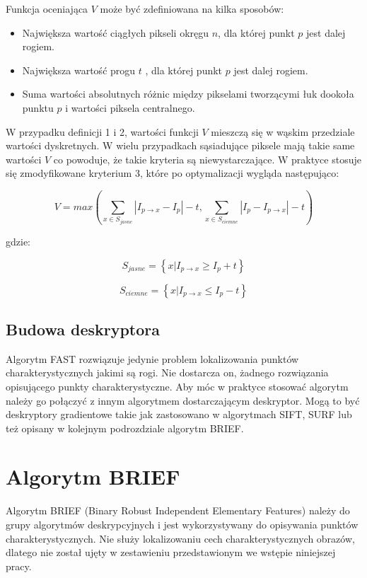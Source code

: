 Funkcja oceniająca $V$ może być zdefiniowana na kilka sposobów:
\begin{itemize}
\item Największa wartość ciągłych pikseli okręgu $n$, dla której punkt $p$ jest dalej rogiem.
\item Największa wartość progu $t$ , dla której punkt $p$ jest dalej rogiem.
\item Suma wartości absolutnych różnic między pikselami tworzącymi łuk dookoła punktu $p$ i wartości piksela centralnego.
\end{itemize}

W przypadku definicji 1 i 2, wartości funkcji $V$ mieszczą się w wąskim przedziale wartości dyskretnych. W wielu przypadkach sąsiadujące piksele mają takie same wartości $V$ co powoduje, że takie kryteria są niewystarczające. W praktyce stosuje się zmodyfikowane kryterium 3, które po optymalizacji wygląda następująco:


\begin{equation}
V = max \left( \sum_{x\in S_{jasne}} |I_{p \rightarrow x}-I_p| - t , \sum_{x\in S_{ciemne}} |I_p-I_{p \rightarrow x}| - t  \right)
\end{equation}

gdzie:

\begin{equation}
S_{jasne} = \left\lbrace x|I_{p\rightarrow x} \geq I_{p} + t \right\rbrace
\end{equation}

\begin{equation}
S_{ciemne} = \left\lbrace x|I_{p\rightarrow x} \leq I_{p} - t \right\rbrace
\end{equation}

\subsection{Budowa deskryptora}
Algorytm FAST rozwiązuje jedynie problem lokalizowania punktów charakterystycznych jakimi są rogi. Nie dostarcza on, żadnego rozwiązania opisującego punkty charakterystyczne. Aby móc w praktyce stosować algorytm należy go połączyć z innym algorytmem dostarczającym deskryptor. Mogą to być deskryptory gradientowe takie jak zastosowano w algorytmach SIFT, SURF lub też opisany w kolejnym podrozdziale algorytm BRIEF.
\FloatBarrier
\newpage
\section{Algorytm BRIEF}
Algorytm BRIEF (Binary Robust Independent Elementary Features) \cite{B1} \cite{B2} należy do grupy algorytmów deskrypcyjnych i jest wykorzystywany do opisywania punktów charakterystycznych. Nie służy lokalizowaniu cech charakterystycznych obrazów, dlatego nie został ujęty w zestawieniu przedstawionym we wstępie niniejszej pracy.

